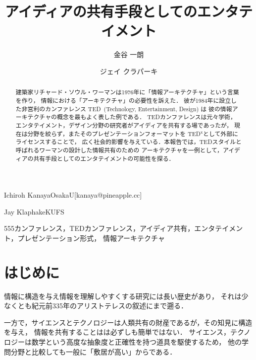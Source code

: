 \documentclass[submit,techreq,jkeyword,noauthor]{ipsj}
\newcommand{\TED}{\textrm{TED}}
\newcommand{\TEDx}{\TED${}^{\textrm{x}}$}
\begin{document}
\title{アイディアの共有手段としてのエンタテイメント}




\author{金谷 一朗}{Ichiroh Kanaya}{OsakaU}[kanaya@pineapple.cc]
\author{ジェイ クラパーキ}{Jay Klaphake}{KUFS}

\begin{abstract}
建築家リチャード・ソウル・ワーマンは1976年に「情報アーキテクチャ」という言葉を作り，
情報における「アーキテクチャ」の必要性を訴えた．
彼が1984年に設立した非営利のカンファレンス \TED\ (Technology, Entertainment, Design) は
彼の情報アーキテクチャの概念を最もよく表した例である．
\TED カンファレンスは元々学術，エンタテイメント，デザイン分野の研究者がアイディアを共有する場であったが，
現在は分野を絞らず，またそのプレゼンテーションフォーマットを \TEDx として外部にライセンスすることで，
広く社会的影響を与えている．本報告では，\TED スタイルと呼ばれるワーマンの設計した情報共有のための
アーキテクチャを一例として，アイディアの共有手段としてのエンタテイメントの可能性を探る．
\end{abstract}


\begin{jkeyword}
555カンファレンス，\TED カンファレンス，アイディア共有，エンタテイメント，プレゼンテーション形式，
情報アーキテクチャ
\end{jkeyword}

\maketitle

\section{はじめに}


情報に構造を与え情報を理解しやすくする研究には長い歴史があり，
それは少なくとも紀元前335年のアリストテレスの叙述にまで遡る．\cite{a}

一方で，サイエンスとテクノロジーは人類共有の財産であるが，その知見に構造を与え，
情報を共有することはは必ずしも簡単ではない．
サイエンス，テクノロジーは数学という高度な抽象度と正確性を持つ道具を駆使するため，
他の学問分野と比較しても一般に「敷居が高い」からである．
\end{document}

